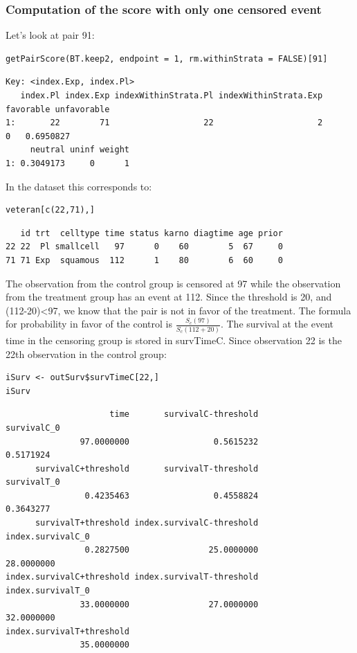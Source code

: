 \documentclass[12pt]{article}
\begin{document}
\subsubsection{Computation of the score with only one censored event}
\label{sec:orgb3867ca}

Let's look at pair 91:
\lstset{language=r,label= ,caption= ,captionpos=b,numbers=none}
\begin{lstlisting}
getPairScore(BT.keep2, endpoint = 1, rm.withinStrata = FALSE)[91]
\end{lstlisting}

\begin{verbatim}
Key: <index.Exp, index.Pl>
   index.Pl index.Exp indexWithinStrata.Pl indexWithinStrata.Exp favorable unfavorable
1:       22        71                   22                     2         0   0.6950827
     neutral uninf weight
1: 0.3049173     0      1
\end{verbatim}


In the dataset this corresponds to:
\lstset{language=r,label= ,caption= ,captionpos=b,numbers=none}
\begin{lstlisting}
veteran[c(22,71),]
\end{lstlisting}

\begin{verbatim}
   id trt  celltype time status karno diagtime age prior
22 22  Pl smallcell   97      0    60        5  67     0
71 71 Exp  squamous  112      1    80        6  60     0
\end{verbatim}


The observation from the control group is censored at 97 while the
observation from the treatment group has an event at 112. Since the
threshold is 20, and (112-20)<97, we know that the pair is not in
favor of the treatment. The formula for probability in favor of the
control is \(\frac{S_c(97)}{S_c(112+20)}\). The survival at the event
time in the censoring group is stored in survTimeC. Since observation
22 is the 22th observation in the control group:
\lstset{language=r,label= ,caption= ,captionpos=b,numbers=none}
\begin{lstlisting}
iSurv <- outSurv$survTimeC[22,] 
iSurv
\end{lstlisting}

\begin{verbatim}
                     time       survivalC-threshold               survivalC_0 
               97.0000000                 0.5615232                 0.5171924 
      survivalC+threshold       survivalT-threshold               survivalT_0 
                0.4235463                 0.4558824                 0.3643277 
      survivalT+threshold index.survivalC-threshold         index.survivalC_0 
                0.2827500                25.0000000                28.0000000 
index.survivalC+threshold index.survivalT-threshold         index.survivalT_0 
               33.0000000                27.0000000                32.0000000 
index.survivalT+threshold 
               35.0000000
\end{verbatim}
\end{document}
